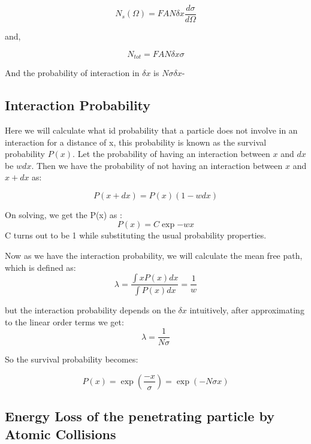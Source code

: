 \documentclass{article}
\begin{document}
\begin{multicols}{2}
\begin{equation}
    N_s(\Omega) = FAN\delta x \frac{d\sigma}{d\Omega}
\end{equation}

and,

\begin{equation}
    N_{tot} = FAN \delta x \sigma
\end{equation}

And the probability of interaction in $\delta x$ is $N\sigma \delta x$-\cite{leo1988techniques}

\subsection{Interaction Probability}

Here we will calculate what id probability that a particle does not involve
in an interaction for a distance of x, this probability is known as the 
survival probability $P(x)$. Let the probability of having an interaction between 
$x$ and $dx$ be $wdx$. Then we have the probability of not having an interaction
between $x$ and $x+dx$ as:

\begin{equation}
    P(x+dx) = P(x)(1-wdx)
\end{equation}

On solving, we get the P(x) as :
\begin{equation}
    P(x) = C\exp{-wx}
\end{equation}
C turns out to be 1 while substituting the usual probability properties.


Now as we have the interaction probability, we will calculate the mean free
path, which is defined as:
\begin{equation}
    \lambda = \frac{\int x P(x)dx}{\int P(x)dx} = \frac{1}{w}
\end{equation}

but the interaction probability depends on the $\delta x$ intuitively, after 
approximating to the linear order terms we get:
\begin{equation}
    \lambda = \frac{1}{N\sigma}
\end{equation}


So the survival probability becomes:

\begin{equation}
    P(x) = \exp{(\frac{-x}{\sigma})}=\exp{(-N\sigma x)}
\end{equation}


\subsection{Energy Loss of the penetrating particle by Atomic Collisions}


\end{multicols}
\end{document}
